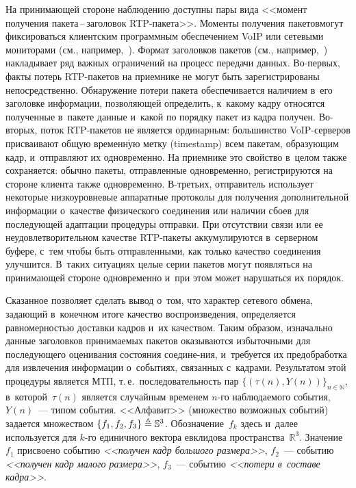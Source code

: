 \begin{multicols}{2}
На принимающей стороне наблюдению доступны пары вида <<момент
получения па\-ке\-та\,--\,за\-го\-ло\-вок RTP-па\-ке\-та>>. Моменты получения
пакетов\linebreak могут фиксироваться клиентским про\-граммным обеспечением VoIP
или сетевыми мониторами (см., например,~\cite{MMA, Wireshark}).
Формат заголовков пакетов (см., например,~\cite{RFC_3550}) накладывает ряд
важных ограничений на процесс передачи данных. Во-пер\-вых, факты
потерь RTP-па\-ке\-тов на приемнике не могут быть зарегистрированы
непосредственно. Обнаружение потери пакета обеспечивается наличием 
в~его заголовке информации, позволяющей определить, к~какому кадру
относятся полученные в~пакете данные и~какой по порядку пакет из
кадра получен. Во-вто\-рых, поток RTP-па\-ке\-тов не является ординарным:
большинство VoIP-сер\-ве\-ров присваивают общую временн$\acute{\mbox{у}}$ю метку
(timestamp) всем пакетам, образующим кадр, и~отправляют их
одновременно. На приемнике это свойство в~целом также сохраняется:
обычно пакеты, отправленные одновременно, регистрируются на стороне
клиента также одновременно. В-третьих, отправитель использует
некоторые низкоуровневые аппаратные протоколы для получения
дополнительной информации о~качестве физического соединения или
наличии сбоев для последующей адаптации процедуры отправки. При
отсутствии связи или ее неудовлетворительном качестве RTP-па\-ке\-ты
аккумулируются в~серверном буфере, с~тем чтобы быть отправленными,
как только качество соединения улучшится. В~таких ситуациях целые
серии пакетов могут появляться на принимающей стороне одновременно 
и~при этом может нарушаться их порядок.

Сказанное позволяет сделать вывод о~том, что характер сетевого
обмена, задающий в~конечном итоге качество воспроизведения,
определяется равномерностью доставки кадров и~их качеством. Таким
образом, изначально данные заголовков принимаемых пакетов
оказываются избыточными для последующего оценивания состояния
соедине-\linebreak ния, и~требуется их предобработка для извлечения информации 
о~событиях, связанных с~кадрами. Результатом этой процедуры является
МТП, т.\,е.\ последовательность пар $\{(\tau(n),Y(n))\}_{n \in
\mathbb{N}}$, в~которой~$\tau(n)$ является случайным временем $n$-го
наблюдаемого события, $Y(n)$~--- типом события. <<Алфавит>>
(множество возможных событий) задается множеством $\{f_1, f_2, f_3\}
\triangleq \mathbb{S}^3$. Обозначение~$f_k$ здесь и~далее используется для
$k$-го единичного вектора евклидова пространства~$\mathbb{R}^3$.
Значение~$f_1$ присвоено событию {\it <<получен кадр большого
размера>>}, $f_2$~--- событию {\it <<получен кадр малого размера>>},
$f_3$~---  событию {\it <<потери в~составе  кадра>>}.


\end{multicols}
